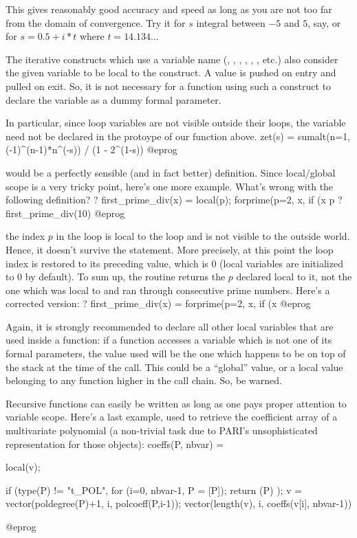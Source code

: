 \noindent This gives reasonably good accuracy and speed as long as you are
not too far from the domain of convergence. Try it for $s$ integral between
$-5$ and $5$, say, or for $s=0.5+i*t$ where $t=14.134\dots$

The iterative constructs which use a variable name (,
, , , , ,
etc.) also consider the given variable to be local to the construct. A value
is pushed on entry and pulled on exit. So, it is not necessary for a function
using such a construct to declare the variable as a dummy formal parameter.

In particular, since loop variables are not visible outside their loops,
the variable  need not be declared in the protoype of our 
function above.
\bprog
zet(s) = sumalt(n=1, (-1)^(n-1)*n^(-s)) / (1 - 2^(1-s))
@eprog

\noindent would be a perfectly sensible (and in fact better) definition.
Since local/global scope is a very tricky point, here's one more example.
What's wrong with the following definition?
\bprog
? first_prime_div(x) = 
{
  local(p);
  forprime(p=2, x, if (x%
  p
}
? first_prime_div(10)
@eprog

 the index $p$ in the  loop is local to
the loop and is not visible to the outside world. Hence, it doesn't survive
the  statement. More precisely, at this point the loop index is
restored to its preceding value, which is 0 (local variables are
initialized to 0 by default). To sum up, the routine returns the $p$
declared local to it, not the one which was local to  and ran
through consecutive prime numbers. Here's a corrected version:
\bprog
? first_prime_div(x) = forprime(p=2, x, if (x%
@eprog

Again, it is strongly recommended to declare all other local variables that
are used inside a function: if a function accesses a variable which is not
one of its formal parameters, the value used will be the one which happens to
be on top of the stack at the time of the call. This could be a ``global''
value, or a local value belonging to any function higher in the call chain.
So, be warned.

Recursive functions can easily be written as long as one
pays proper attention to variable scope. Here's a last example, used to
retrieve the coefficient array of a multivariate polynomial (a non-trivial
task due to PARI's unsophisticated representation for those objects):
\bprog
coeffs(P, nbvar) =
{
  local(v);

  if (type(P) != "t_POL",
    for (i=0, nbvar-1, P = [P]);
    return (P)
  );
  v = vector(poldegree(P)+1, i, polcoeff(P,i-1));
  vector(length(v), i, coeffs(v[i], nbvar-1))
}
@eprog

